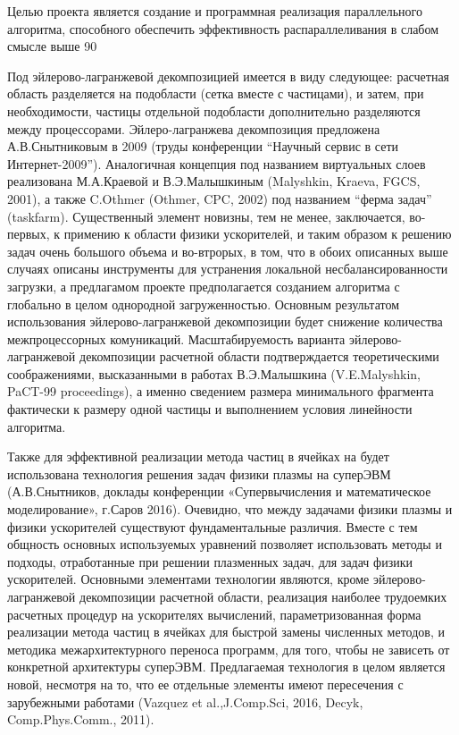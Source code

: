         Целью проекта является создание и программная реализация параллельного алгоритма, способного обеспечить эффективность распараллеливания в слабом смысле выше 90 %
        
        Под эйлерово-лагранжевой декомпозицией имеется в виду следующее: расчетная область разделяется на подобласти (сетка вместе с частицами), и затем, при необходимости, частицы отдельной подобласти дополнительно разделяются между процессорами. Эйлеро-лагранжева декомпозиция предложена А.В.Снытниковым в 2009 (труды конференции “Научный сервис в сети Интернет-2009”). Аналогичная концепция под названием виртуальных слоев реализована М.А.Краевой и В.Э.Малышкиным (Malyshkin, Kraeva, FGCS, 2001), а также C.Othmer (Othmer, CPC, 2002) под названием “ферма задач” (taskfarm). Существенный элемент новизны, тем не менее, заключается, во-первых, к примению к области физики ускорителей, и таким образом к решению задач очень большого объема и во-втрорых, в том, что в обоих описанных выше случаях описаны инструменты для устранения локальной несбалансированности загрузки, а предлагамом проекте предполагается созданием алгоритма с глобально в целом однородной загруженностью. Основным результатом использования эйлерово-лагранжевой декомпозиции будет снижение количества межпроцессорных комуникаций. Масштабируемость варианта эйлерово-лагранжевой декомпозиции расчетной области подтверждается теоретическими соображениями, высказанными в работах В.Э.Малышкина (V.E.Malyshkin, PaCT-99 proceedings), а именно сведением размера минимального фрагмента фактически к размеру одной частицы и выполнением условия линейности алгоритма.
        
        Также для эффективной реализации метода частиц в ячейках на будет использована технология решения задач физики плазмы на суперЭВМ (А.В.Снытников, доклады конференции «Супервычисления и математическое моделирование», г.Саров 2016). Очевидно, что между задачами физики плазмы и физики ускорителей существуют фундаментальные различия. Вместе с тем общность основных используемых уравнений позволяет использовать методы и подходы, отработанные при решении плазменных задач, для задач физики ускорителей. Основными элементами технологии являются, кроме эйлерово-лагранжевой декомпозиции расчетной области, реализация наиболее трудоемких расчетных процедур на ускорителях вычислений, параметризованная форма реализации метода частиц в ячейках для быстрой замены численных методов, и методика межархитектурного переноса программ, для того, чтобы не зависеть от конкретной архитектуры суперЭВМ. Предлагаемая технология в целом является новой, несмотря на то, что ее отдельные элементы имеют пересечения с зарубежными работами (Vazquez
        et al.,J.Comp.Sci, 2016, Decyk, Comp.Phys.Comm., 2011).
        

